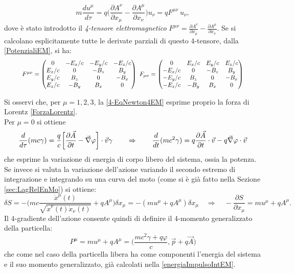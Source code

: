 \begin{equation}
    m\frac{du^\mu}{d\tau}=q\bigg(\frac{\partial A^\nu}{\partial x_\mu}-\frac{\partial A^\mu}{\partial x_\nu}\bigg)u_\nu=qF^{\mu\nu}\ u_\nu,\label{4-EqNewton4EM}
\end{equation}
dove è stato introdotto il \emph{4-tensore elettromagnetico} $F^{\mu\nu}=\frac{\partial A^\nu}{\partial x_\mu}-\frac{\partial A^\mu}{\partial x_\nu}$. Se si calcolano esplicitamente tutte le derivate parziali di questo 4-tensore, dalla \eqref{PotenzialiEM}, si ha:
\begin{equation}
    \label{4-tensoreEM}
    \resizebox{0.9\hsize}{!}{$F^{\mu\nu}=
    \begin{pmatrix}
        0&-E_x/c&-E_y/c&-E_z/c\\
        E_x/c&0&-B_z&B_y\\
        E_y/c&B_z&0&-B_x\\
        E_z/c&-B_y&B_x&0\\
 \end{pmatrix}\ 
 F_{\mu\nu}=
 \begin{pmatrix}
     0&E_x/c&E_y/c&E_z/c\\
     -E_x/c&0&-B_z&B_y\\
     -E_y/c&B_z&0&-B_x\\
     -E_z/c&-B_y&B_x&0\\
\end{pmatrix}$}
\end{equation}

Si osservi che, per $\mu=1,2,3$, la \eqref{4-EqNewton4EM} esprime proprio la forza di Lorentz \eqref{ForzaLorentz}.\\ Per $\mu=0$ si ottiene
\begin{equation}
    \frac{d}{d\tau}(mc\gamma)=\frac{q}{c}\bigg[\frac{\partial \vec A}{\partial t}-\vec{\nabla} \varphi\bigg]\cdot \vec v\gamma \qquad \Rightarrow \qquad \frac{d}{dt}(mc^2\gamma)=q\frac{\partial \vec A}{\partial t}\cdot \vec v - q\vec{\nabla} \varphi\cdot \vec v
\end{equation}
che esprime la variazione di energia di corpo libero del sistema, ossia la potenza.\\

Se invece si valuta la variazione dell'azione variando il secondo estremo di integrazione e integrando su una curva del moto (come si è già fatto nella Sezione \ref{sec:LagRelEnMo}) si ottiene:
\begin{equation*}
    \delta S=-\bigg(mc\frac{\dot x^\mu(t)}{\sqrt{\dot x^\nu(t)\dot x_\nu(t)}}+qA^\mu\bigg)\delta x_\mu=-(mu^\mu+qA^\mu)\delta x_\mu \quad \Rightarrow \quad -\frac{\partial S}{\partial x_\mu}=mu^\mu+qA^\mu.
\end{equation*}
Il 4-gradiente dell'azione consente quindi di definire il 4-momento generalizzato della particella:
\begin{equation}
    P^\mu=mu^\mu+qA^\mu=\bigg(\frac{mc^2\gamma+q\varphi}{c},\vec p+q\vec A\bigg)
\end{equation}
che come nel caso della particella libera ha come componenti l'energia del sistema e il suo momento generalizzato, già calcolati nella \eqref{energiaImpulsoIntEM}.
